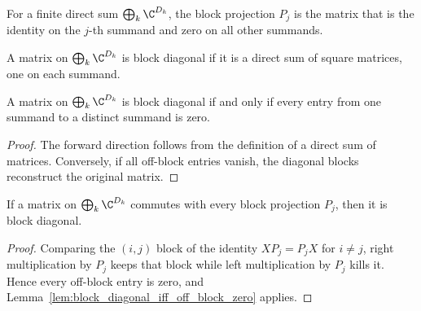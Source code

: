 \begin{definition}\label{def:block_projection}
    \leanok
    For a finite direct sum $\bigoplus_k \C^{D_k}$, the block projection $P_j$
    is the matrix that is the identity on the $j$-th summand and zero on all
    other summands.
\end{definition}

\begin{definition}\label{def:block_diagonal_matrix}
    \leanok
    A matrix on $\bigoplus_k \C^{D_k}$ is block diagonal if it is a direct sum
    of square matrices, one on each summand.
\end{definition}

\begin{lemma}\label{lem:block_diagonal_iff_off_block_zero}
    \leanok
    A matrix on $\bigoplus_k \C^{D_k}$ is block diagonal if and only if every
    entry from one summand to a distinct summand is zero.
\end{lemma}

\begin{proof}\leanok
    The forward direction follows from the definition of a direct sum of
    matrices. Conversely, if all off-block entries vanish, the diagonal blocks
    reconstruct the original matrix.
\end{proof}

\begin{lemma}
    \label{lem:block_diagonal_of_commutes_block_projection}
    \leanok
    If a matrix on $\bigoplus_k \C^{D_k}$ commutes with every block projection
    $P_j$, then it is block diagonal.
\end{lemma}

\begin{proof}\leanok
    Comparing the $(i,j)$ block of the identity $XP_j=P_jX$ for $i\ne j$,
    right multiplication by $P_j$ keeps that block while left multiplication
    by $P_j$ kills it. Hence every off-block entry is zero,
    and Lemma~\ref{lem:block_diagonal_iff_off_block_zero} applies.
\end{proof}

